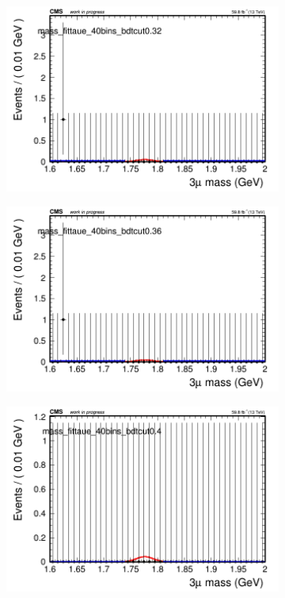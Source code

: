 \begin{figure}[H]
\begin{subfigure}{0.2\textwidth}
        \caption{}
    \end{subfigure}
    \begin{subfigure}{0.2\textwidth}
        \includegraphics[width=\textwidth]{flat_fit/plots/taue/massfit_taue_40bins_bdtcut0.32.png}
        \caption{}
    \end{subfigure}
    \begin{subfigure}{0.2\textwidth}
        \includegraphics[width=\textwidth]{flat_fit/plots/taue/massfit_taue_40bins_bdtcut0.36.png}
        \caption{}
    \end{subfigure}
    \begin{subfigure}{0.2\textwidth}
        \includegraphics[width=\textwidth]{flat_fit/plots/taue/massfit_taue_40bins_bdtcut0.4.png}

\end{subfigure}
\end{figure}
